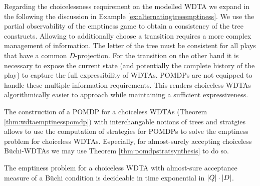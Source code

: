 Regarding the choicelessness requirement on the modelled \ac{WDTA} we expand in
the following the discussion in Example \ref{ex:alternatingtreeemptiness}. We
use the partial observability of the emptiness game to obtain a consistency of
the tree \eve{} constructs. Allowing \eve{} to additionally choose a transition
requires a more complex management of information. The letter of the tree must
be consistent for all plays that have a common $D$-projection. For the
transition on the other hand it is necessary to expose the current state (and
potentially the complete history of the play) to capture the full
expressibility of \acp{WDTA}. \acp{POMDP} are not equipped to handle these
multiple information requirements. This renders choiceless \acp{WDTA}
algorithmically easier to approach while maintaining a sufficient
expressiveness.

The construction of a \ac{POMDP} for a choiceless \acp{WDTA}
(Theorem \ref{thm:wdtaemptinesspomdp}) with interchangable notions of trees and
stratgies allows to use the computation of strategies for \acp{POMDP} to solve
the emptiness problem for choiceless \acp{WDTA}. Especially, for almost-surely
accepting choiceless Büchi-\acp{WDTA} we may use Theorem
\ref{thm:pomdpstratsynthesis} to do so.
\begin{corollary}
  The emptiness problem for a choiceless \ac{WDTA} with almost-sure acceptance 
  measure of a Büchi condition is decideable in time exponential in
  $\left\vert{Q}\right\vert\cdot\left\vert{D}\right\vert$.
  \label{cor:emptiness}
\end{corollary}

